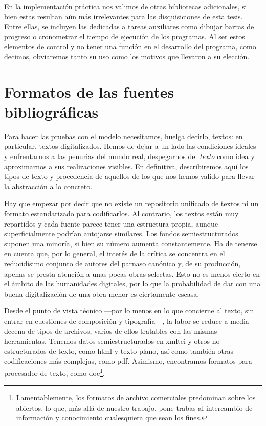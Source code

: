 En la implementación práctica nos valimos de otras bibliotecas adicionales, si bien estas resultan aún más irrelevantes para las disquisiciones de esta tesis. Entre ellas, se incluyen las dedicadas a tareas auxiliares como dibujar barras de progreso o cronometrar el tiempo de ejecución de los programas. Al ser estos elementos de control y no tener una función en el desarrollo del programa, como decimos, obviaremos tanto su uso como los motivos que llevaron a su elección.

\section{Formatos de las fuentes bibliográficas}
Para hacer las pruebas con el modelo necesitamos, huelga decirlo, textos: en particular, textos digitalizados. Hemos de dejar a un lado las condiciones ideales y enfrentarnos a las penurias del mundo real, despegarnos del \textit{texto} como idea y aproximarnos a sus realizaciones visibles. En definitiva, describiremos aquí los tipos de texto y procedencia de aquellos de los que nos hemos valido para llevar la abstracción a lo concreto.

Hay que empezar por decir que no existe un repositorio unificado de textos ni un formato estandarizado para codificarlos. Al contrario, los textos están muy repartidos y cada fuente parece tener una estructura propia, aunque superficialmente podrían antojarse similares. Los fondos semiestructurados suponen una minoría, si bien su número aumenta constantemente. Ha de tenerse en cuenta que, por lo general, el interés de la crítica se concentra en el reducidísimo conjunto de autores del parnaso canónico y, de su producción, apenas se presta atención a unas pocas obras selectas. Esto no es menos cierto en el ámbito de las humanidades digitales, por lo que la probabilidad de dar con una buena digitalización de una obra menor es ciertamente escasa.

Desde el punto de vista técnico —por lo menos en lo que concierne al texto, sin entrar en cuestiones de composición y tipografía—, la labor se reduce a media decena de tipos de archivos, varios de ellos tratables con las mismas herramientas. Tenemos datos semiestructurados en \ac{xmltei} y otros no estructurados de texto, como \ac{html} y texto plano, así como también otras codificaciones más complejas, como \ac{pdf}. Asimismo, encontramos formatos para procesador de texto, como \ac{doc}\footnote{Lamentablemente, los formatos de archivo comerciales predominan sobre los abiertos, lo que, más allá de nuestro trabajo, pone trabas al intercambio de información y conocimiento cualesquiera que sean los fines.}. 

